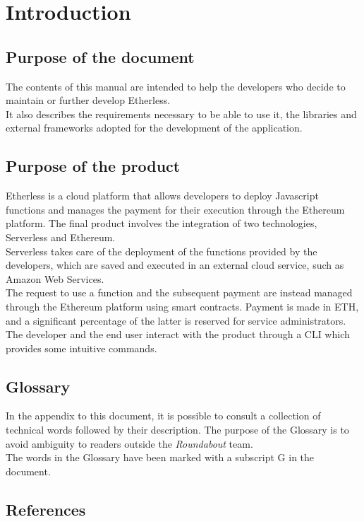 \section{Introduction}

	\subsection{Purpose of the document}
	The contents of this manual are intended to help the developers who decide to maintain or further develop Etherless. \\
	It also describes the requirements necessary to be able to use it, the libraries and external frameworks adopted for the development of the application.
	
	
	\subsection{Purpose of the product}
	Etherless is a cloud platform that allows developers to deploy Javascript functions and manages the payment for their execution through the Ethereum platform.
	The final product involves the integration of two technologies, Serverless and Ethereum.\\
	Serverless takes care of the deployment of the functions provided by the developers, which are saved and executed in an external cloud service, such as Amazon Web Services.\\
	The request to use a function and the subsequent payment are instead managed through the Ethereum platform using smart contracts. Payment is made in ETH, and a significant percentage of the latter is reserved for service administrators.\\
	The developer and the end user interact with the product through a CLI which provides some intuitive commands.

	
	\subsection{Glossary}
	In the appendix to this document, it is possible to consult a collection of technical words followed by their description. The purpose of the Glossary is to avoid ambiguity to readers outside the \textit{Roundabout} team.\\
	The words in the Glossary have been marked with a subscript G in the document.
	
	
	\subsection{References}
	
